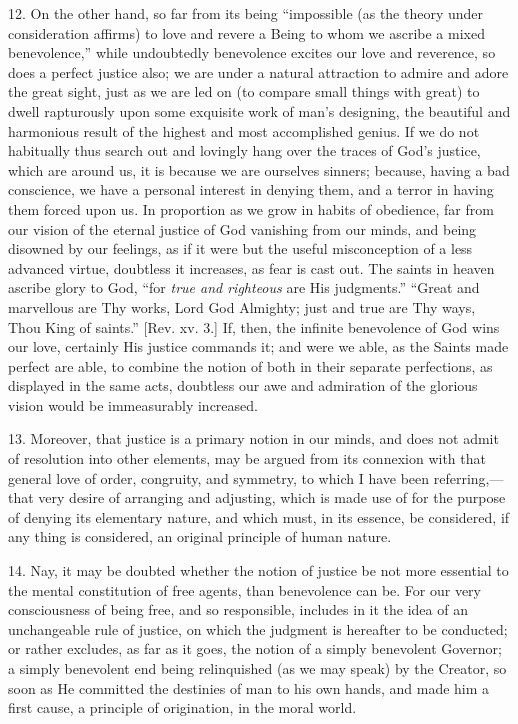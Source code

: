 12. On the other hand, so far from its being ``impossible (as
the theory under consideration affirms) to love and revere a Being to
whom we ascribe a mixed benevolence,'' while undoubtedly
benevolence excites our love and reverence, so does a perfect justice
also; we are under a natural attraction to admire and adore the great
sight, just as we are led on (to compare small things with great) to
dwell rapturously upon some exquisite work of man's designing, the
beautiful and harmonious result of the highest and most accomplished
genius. If we do not habitually thus search out and lovingly hang over
the traces of God's justice, which are around us, it is because we are
ourselves sinners; because, having a bad conscience, we have a
personal interest in denying them, and a terror in having them forced
upon us. In proportion as we grow in habits of obedience, far from our
vision of the eternal justice of God vanishing from our minds, and
being disowned by our feelings, as if it were but the useful
misconception of a less advanced virtue, doubtless it increases, as
fear is cast out. The saints in heaven ascribe glory to God, ``for
\emph{true and righteous} are His judgments.'' ``Great and
marvellous are Thy works, Lord God Almighty; just and true are Thy
ways, Thou King of saints.'' [Rev. xv. 3.] If, then, the infinite
benevolence of God wins our love, certainly His justice commands it;
and were we able, as the Saints made perfect are able, to combine the
notion of both in their separate perfections, as displayed in the same
acts, doubtless our awe and admiration of the glorious vision would be
immeasurably increased.

13. Moreover, that justice is a primary notion in our minds, and
does not admit of resolution into other elements, may be argued from
its connexion with that general love of order, congruity, and
symmetry, to which I have been referring,—that very desire of
arranging and adjusting, which is made use of for the purpose of
denying its elementary nature, and which must, in its essence, be
considered, if any thing is considered, an original principle of human
nature.

14. Nay, it may be doubted whether the notion of justice be not
more essential to the mental constitution of free agents, than
benevolence can be. For our very consciousness of being free, and so
responsible, includes in it the idea of an unchangeable rule of
justice, on which the judgment is hereafter to be conducted; or rather
excludes, as far as it goes, the notion of a simply benevolent
Governor; a simply benevolent end being relinquished (as we may speak)
by the Creator, so soon as He committed the destinies of man to his
own hands, and made him a first cause, a principle of origination, in
the moral world.

